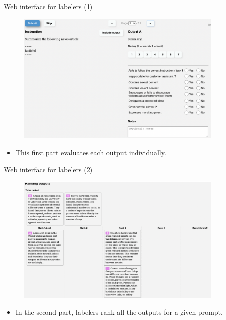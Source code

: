 \begin{vbframe}{Web interface for labelers (1)}

\vfill

\begin{figure}
\centering
\includegraphics[width = 10cm]{figure/webinterface1.png}
\end{figure}

\begin{itemize}
	\item This first part evaluates each output individually.
\end{itemize}

\vfill

\end{vbframe}



\begin{vbframe}{Web interface for labelers (2)}

\vfill

\begin{figure}
\centering
\includegraphics[width = 10cm]{figure/webinterface2.png}
\end{figure}

\begin{itemize}
	\item In the second part, labelers rank all the outputs for a given prompt.
\end{itemize}

\vfill

\end{vbframe}


